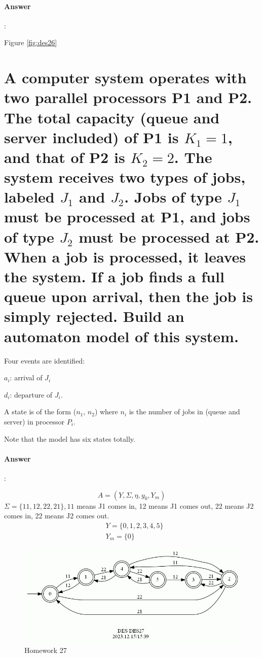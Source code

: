 \documentclass{article}
\begin{document}
\paragraph{Answer}:



Figure \ref{fig:des26}

\section{A computer system operates with two parallel processors P1 and P2. The total capacity (queue and server included) of P1 is $K_1 = 1$, and that of P2 is $K_2 = 2$. The system receives two types of jobs, labeled $J_1$ and $J_2$. Jobs of type $J_1$ must be processed at P1, and jobs of type $J_2$ must be processed at P2. When a job is processed, it leaves the system. If a job finds a full queue upon arrival, then the job is simply rejected. Build an automaton model of this system.}

\begin{tcolorbox}
  Four events are identified: 
  
  $a_i$: arrival of $J_i$ 

  $d_i$: departure of $J_i$.
  
  A state is of the form ($n_1$, $n_2$) where $n_i$ is the number of jobs in (queue and server) in processor $P_i$. 
  
  Note that the model has six states totally.
\end{tcolorbox}

\paragraph{Answer}: 


$$
A=\left(Y, \Sigma, \eta, y_0, Y_m\right)
$$
$\Sigma=\{11,12,22,21\}, 11$ means J1 comes in, 12 means J1 comes out, 22 means J2 comes in, 22 means $\mathrm{J} 2$ comes out.
$$
\begin{aligned}
& Y=\{0,1,2,3,4,5\} \\
& Y_m=\{0\}
\end{aligned}
$$



\begin{figure}[h!]
  \centering
  \includegraphics[width=\textwidth]{assets/DES27.jpg}
  \caption{Homework 27}
  \label{fig:des27}
\end{figure}
\end{document}
